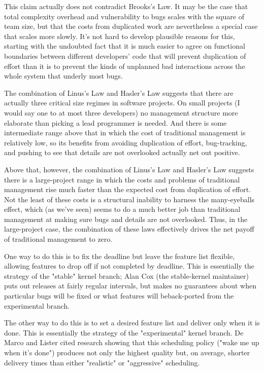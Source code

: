 \documentclass[a4paper,12pt,UTF8,twoside]{ctexbook}
\begin{document}
This claim actually does not contradict Brooks's Law. It may be the case that total complexity overhead and vulnerability to bugs scales with the square of team size, but that the costs from duplicated work are nevertheless a special case that scales more slowly. It's not hard to develop plausible reasons for this, starting with the undoubted fact that it is much easier to agree on functional boundaries between different developers' code that will prevent duplication of effort than it is to prevent the kinds of unplanned bad interactions across the whole system that underly most bugs.

The combination of Linus's Law and Hasler's Law suggests that there are actually three critical size regimes in software projects. On small projects (I would say one to at most three developers) no management structure more elaborate than picking a lead programmer is needed. And there is some intermediate range above that in which the cost of traditional management is relatively low, so its benefits from avoiding duplication of effort, bug-tracking, and pushing to see that details are not overlooked actually net out positive.

Above that, however, the combination of Linus's Law and Hasler's Law suggests there is a large-project range in which the costs and problems of traditional management rise much faster than the expected cost from duplication of effort. Not the least of these costs is a structural inability to harness the many-eyeballs effect, which (as we've seen) seems to do a much better job than traditional management at making sure bugs and details are not overlooked. Thus, in the large-project case, the combination of these laws effectively drives the net payoff of traditional management to zero.

One way to do this is to fix the deadline but leave the feature list flexible, allowing features to drop off if not completed by deadline. This is essentially the strategy of the "stable" kernel branch; Alan Cox (the stable-kernel maintainer) puts out releases at fairly regular intervals, but makes no guarantees about when particular bugs will be fixed or what features will beback-ported from the experimental branch.

The other way to do this is to set a desired feature list and deliver only when it is done. This is essentially the strategy of the "experimental" kernel branch. De Marco and Lister cited research showing that this scheduling policy ("wake me up when it's done") produces not only the highest quality but, on average, shorter delivery times than either "realistic" or "aggressive" scheduling.
\end{document}

